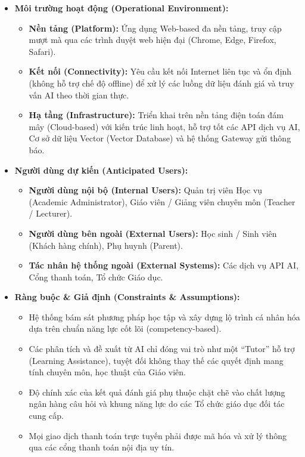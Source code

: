 \documentclass[12pt,a4paper,oneside]{report}
\begin{document}
\begin{itemize}
    \item \textbf{Môi trường hoạt động (Operational Environment):}
    \begin{itemize}
        \item \textbf{Nền tảng (Platform):} Ứng dụng Web-based đa nền tảng, truy cập mượt mà qua các trình duyệt web hiện đại (Chrome, Edge, Firefox, Safari).
        \item \textbf{Kết nối (Connectivity):} Yêu cầu kết nối Internet liên tục và ổn định (không hỗ trợ chế độ offline) để xử lý các luồng dữ liệu đánh giá và truy vấn AI theo thời gian thực.
        \item \textbf{Hạ tầng (Infrastructure):} Triển khai trên nền tảng điện toán đám mây (Cloud-based) với kiến trúc linh hoạt, hỗ trợ tốt các API dịch vụ AI, Cơ sở dữ liệu Vector (Vector Database) và hệ thống Gateway gửi thông báo.
    \end{itemize}

    \item \textbf{Người dùng dự kiến (Anticipated Users):}
    \begin{itemize}
        \item \textbf{Người dùng nội bộ (Internal Users):} Quản trị viên Học vụ (Academic Administrator), Giáo viên / Giảng viên chuyên môn (Teacher / Lecturer).
        \item \textbf{Người dùng bên ngoài (External Users):} Học sinh / Sinh viên (Khách hàng chính), Phụ huynh (Parent).
        \item \textbf{Tác nhân hệ thống ngoài (External Systems):} Các dịch vụ API AI, Cổng thanh toán, Tổ chức Giáo dục.
    \end{itemize}

    \item \textbf{Ràng buộc \& Giả định (Constraints \& Assumptions):}
    \begin{itemize}
        \item Hệ thống bám sát phương pháp học tập và xây dựng lộ trình cá nhân hóa dựa trên chuẩn năng lực cốt lõi (competency-based).
        \item Các phân tích và đề xuất từ AI chỉ đóng vai trò như một ``Tutor'' hỗ trợ (Learning Assistance), tuyệt đối không thay thế các quyết định mang tính chuyên môn, học thuật của Giáo viên.
        \item Độ chính xác của kết quả đánh giá phụ thuộc chặt chẽ vào chất lượng ngân hàng câu hỏi và khung năng lực do các Tổ chức giáo dục đối tác cung cấp.
        \item Mọi giao dịch thanh toán trực tuyến phải được mã hóa và xử lý thông qua các cổng thanh toán nội địa uy tín.
    \end{itemize}


\end{itemize}
\end{document}
